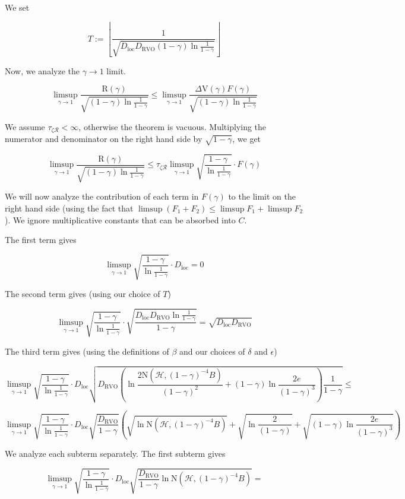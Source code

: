 \documentclass[a4paper]{article}
\newcommand{\AP}[1]{\left(#1\right)}
\newcommand{\Floor}[1]{\left\lfloor #1 \right\rfloor}
\newcommand{\B}{B}
\newcommand{\R}{\mathcal{R}}
\newcommand{\Hy}{\mathcal{H}}
\newcommand{\DRVO}{D_{\mathrm{RVO}}}
\newcommand{\DL}{D_{\mathrm{loc}}}
\newcommand{\N}{\mathrm{N}}
\newcommand{\V}{\mathrm{V}}
\newcommand{\Reg}{\mathrm{R}}
\newcommand{\De}{\Delta}
\begin{document}
We set

$$T:=\Floor{\frac{1}{\sqrt{\DL\DRVO(1-\gamma)\ln\frac{1}{1-\gamma}}}}$$

Now, we analyze the $\gamma\rightarrow1$ limit.

$$\limsup_{\gamma\rightarrow1}{\frac{\Reg(\gamma)}{\sqrt{(1-\gamma)\ln{\frac{1}{1-\gamma}}}}}\leq \limsup_{\gamma\rightarrow1}{\frac{\De\V(\gamma)F(\gamma)}{\sqrt{(1-\gamma)\ln{\frac{1}{1-\gamma}}}}}$$

We assume $\tau_{\zeta\R}<\infty$, otherwise the theorem is vacuous. Multiplying the numerator and denominator on the right hand side by $\sqrt{1-\gamma}$, we get

$$\limsup_{\gamma\rightarrow1}{\frac{\Reg(\gamma)}{\sqrt{(1-\gamma)\ln{\frac{1}{1-\gamma}}}}}\leq  \tau_{\zeta\R}\limsup_{\gamma\rightarrow1}{\sqrt{\frac{1-\gamma}{\ln{\frac{1}{1-\gamma}}}}\cdot F(\gamma)}$$

We will now analyze the contribution of each term in $F(\gamma)$ to the limit on the right hand side (using the fact that $\limsup\AP{F_1+F_2}\leq\limsup{F_1}+\limsup{F_2}$). We ignore multiplicative constants that can be absorbed into $C$.

The first term gives

$$\limsup_{\gamma\rightarrow1}{\sqrt{\frac{1-\gamma}{\ln{\frac{1}{1-\gamma}}}}\cdot\DL} = 0$$

The second term gives (using our choice of $T$)

$$\limsup_{\gamma\rightarrow1}{\sqrt{\frac{1-\gamma}{\ln{\frac{1}{1-\gamma}}}}\cdot\sqrt{\frac{\DL\DRVO\ln{\frac{1}{1-\gamma}}}{1-\gamma}}} = \sqrt{\DL\DRVO}$$

The third term gives (using the definitions of $\beta$ and our choices of $\delta$ and $\epsilon$)

$$\limsup_{\gamma\rightarrow1}{\sqrt{\frac{1-\gamma}{\ln{\frac{1}{1-\gamma}}}}\cdot\DL\sqrt{\DRVO\AP{\ln{\frac{2\N\AP{\Hy,(1-\gamma)^{-4}\B}}{(1-\gamma)^2}}+(1-\gamma) \ln{\frac{2e}{(1-\gamma)^3}}}\frac{1}{1-\gamma}}}\leq$$

$$\limsup_{\gamma\rightarrow1}{\sqrt{\frac{1-\gamma}{\ln{\frac{1}{1-\gamma}}}}\cdot\DL\sqrt{\frac{\DRVO}{1-\gamma}}\AP{\sqrt{\ln {\N\AP{\Hy,(1-\gamma)^{-4}\B}}}+\sqrt{\ln{\frac{2}{(1-\gamma)}}}+\sqrt{(1-\gamma) \ln{\frac{2e}{(1-\gamma)^3}}}}}$$

We analyze each subterm separately. The first subterm gives

$$\limsup_{\gamma\rightarrow1}{\sqrt{\frac{1-\gamma}{\ln{\frac{1}{1-\gamma}}}}\cdot\DL\sqrt{\frac{\DRVO}{1-\gamma}\ln{\N\AP{\Hy,(1-\gamma)^{-4}\B }}}}=$$
\end{document}
